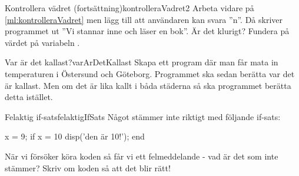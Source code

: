 \begin{matteovning}{Kontrollera vädret (fortsättning)}{kontrolleraVadret2}
Arbeta vidare på \autoref{ml:kontrolleraVadret} men lägg till att användaren kan svara ''n''. Då skriver programmet ut ''Vi stannar inne och läser en bok''. Är det klurigt? Fundera på värdet på variabeln .
\end{matteovning}


\begin{matteovning}{Var är det kallast?}{varArDetKallast}
Skapa ett program där man får mata in temperaturen i Östersund och Göteborg. Programmet ska sedan berätta var det är kallast. Men om det är lika kallt i båda städerna så ska programmet berätta detta istället.
\end{matteovning}


\begin{matteovning}{Felaktig if-sats}{felaktigIfSats}
Något stämmer inte riktigt med följande if-sats:

\vspace{10pt}
\begin{matlab}
x = 9;
if x = 10
    disp('den är 10!');
end
\end{matlab}

När vi försöker köra koden så får vi ett felmeddelande - vad är det som inte stämmer? Skriv om koden så att det blir rätt!
\end{matteovning}
